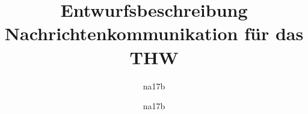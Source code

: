 \documentclass[a4paper,11pt,oneside, titlepage]{article}
\title{Entwurfsbeschreibung \\ Nachrichtenkommunikation für das THW}
\author{na17b}
\date{}
\author{na17b}
\begin{document}
  \maketitle

  \newpage

  \tableofcontents

  \newpage

  

  

  

  

  

  

  \newpage

  \printglossaries
  
\end{document}
